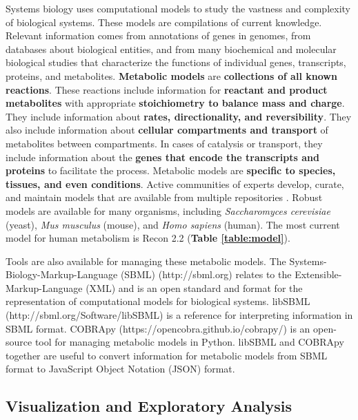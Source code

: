Systems biology uses computational models \supercite{thiele_protocol_2010, obrien_using_2015, bordbar_constraint-based_2014} to study the vastness and complexity of biological systems.
These models are compilations of current knowledge.
Relevant information comes from annotations of genes in genomes, from databases about biological entities, and from many biochemical and molecular biological studies that characterize the functions of individual genes, transcripts, proteins, and metabolites.
\textbf{Metabolic models} are \textbf{collections of all known reactions}.
These reactions include information for \textbf{reactant and product metabolites} with appropriate \textbf{stoichiometry to balance mass and charge}.
They include information about \textbf{rates, directionality, and reversibility}.
They also include information about \textbf{cellular compartments and transport} of metabolites between compartments.
In cases of catalysis or transport, they include information about the \textbf{genes that encode the transcripts and proteins} to facilitate the process.
Metabolic models are \textbf{specific to species, tissues, and even conditions}.
Active communities of experts develop, curate, and maintain models that are available from multiple repositories \supercite{pornputtapong_human_2015, moretti_metanetx/mnxref--reconciliation_2016, king_bigg_2016}.
Robust models are available for many organisms, including \textit{Saccharomyces cerevisiae} (yeast), \textit{Mus musculus} (mouse), and \textit{Homo sapiens} (human).
The most current model for human metabolism is Recon 2.2 \supercite{thiele_community-driven_2013, swainston_recon_2016} (\textbf{Table \ref{table:model}}).


Tools are also available for managing these metabolic models.
The Systems-Biology-Markup-Language (SBML) (http://sbml.org) relates to the Extensible-Markup-Language (XML) and is an open standard and format for the representation of computational models for biological systems.
libSBML \supercite{bornstein_libsbml:_2008} (http://sbml.org/Software/libSBML) is a reference for interpreting information in SBML format.
COBRApy \supercite{ebrahim_cobrapy:_2013} (https://opencobra.github.io/cobrapy/) is an open-source tool for managing metabolic models in Python.
libSBML and COBRApy together are useful to convert information for metabolic models from SBML format to JavaScript Object Notation (JSON) format.

\subsection{Visualization and Exploratory Analysis}

